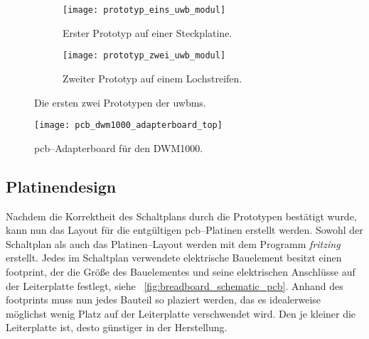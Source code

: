 \begin{figure}
	\begin{subfigure}[t]{0.4\textwidth}
		\texttt{[image: prototyp\_eins\_uwb\_modul]}
		\caption{Erster Prototyp auf einer Steckplatine.}
		\label{fig:prototyp_eins_uwb_modul}
	\end{subfigure}
	\hfill
	\begin{subfigure}[t]{0.4\textwidth}
		\texttt{[image: prototyp\_zwei\_uwb\_modul]}
		\caption{Zweiter Prototyp auf einem Lochstreifen.}
		\label{fig:prototyp_zwei_uwb_modul}
	\end{subfigure}
	\caption{Die ersten zwei Prototypen der \glspl{uwbm}.}
	\label{fig:prototypen_der_uwb_module}
\end{figure}

\begin{figure}
  \centering
  \texttt{[image: pcb\_dwm1000\_adapterboard\_top]}
  \caption{\gls{pcb}--Adapterboard für den DWM1000.}
  \label{fig:pcb_dwm1000_adapterboard_top}
\end{figure}


\begin{comment}
------------------------------------------------------------------------------------------
+ Der initiale Aufbau erfolgt zu Evaluationszwecken auf einem Steckboard und zusätzlich auf einer separaten Lochstreifenplatine um das Zusammenspiel zweier UWB--Module zu testen. Nach dem erfolgreichen Systemtest wird aus dem erstellten Schaltplan, ein PCB--Layout erstellt, mehrere PCB--Boards bestellt und nach der Lieferung zusammengebaut und noch mal getestet.
+ Antenne
+ Aufrecht stehend
+ Batterie auf der Rückseite bietet stabilität
	+ Flachere Akkus können auch verwendet werden
+ Ansteckbares FTDI
+ Preis pro Platinengröße
- Footprint of DWM1000
+ AutoRoute
- TODO: Ground Fill with Copper
- Wikipedia: In der Antennentechnik (Satellitenfunk) bezeichnet der Azimutwinkel die horizontale Ausrichtung einer Antenne, im Gegensatz zur Elevation, die den vertikalen Winkel zwischen Horizont und Antennenrichtung angibt.
\end{comment}
\subsection{Platinendesign}

Nachdem die Korrektheit des Schaltplans durch die Prototypen bestätigt wurde, kann nun das Layout für die entgültigen \gls{pcb}--Platinen erstellt werden. Sowohl der Schaltplan als auch das Platinen--Layout werden mit dem Programm \textit{fritzing}\cite{fritzing} erstellt. Jedes im Schaltplan verwendete elektrische Bauelement besitzt einen \gls{footprint}, der die Größe des Bauelementes und seine elektrischen Anschlüsse auf der Leiterplatte festlegt, siehe \figurename~\ref{fig:breadboard_schematic_pcb}. Anhand des \glspl{footprint} muss nun jedes Bauteil so plaziert werden, das es idealerweise möglichst wenig Platz auf der Leiterplatte verschwendet wird. Den je kleiner die Leiterplatte ist, desto günstiger in der Herstellung.

